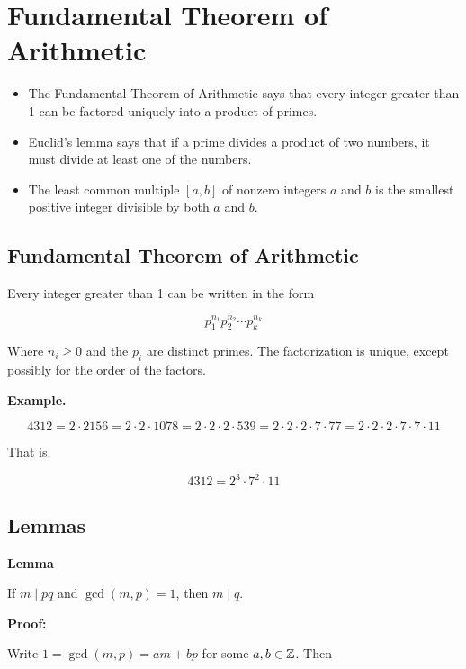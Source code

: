 \newpage
\section{Fundamental Theorem of Arithmetic}

\begin{itemize}

	\item The Fundamental Theorem of Arithmetic says that every integer greater than 1 can be factored 
		 uniquely into a product of primes.
	
	\item Euclid’s lemma says that if a prime divides a product of two numbers, it must divide at least 
		  one of the numbers.
	
	\item The least common multiple \([a, b]\) of nonzero integers \(a\) and \(b\) is the smallest positive 
	      integer divisible by both \(a\) and \(b\).

\end{itemize}

\subsection{Fundamental Theorem of Arithmetic}

Every integer greater than 1 can be written in the form

\[
	p_1^{n_1}p_2^{n_2} \cdots p_k^{n_k}
\]

Where \(n_i \geq 0\) and the \(p_i\) are distinct primes. The factorization is unique, except possibly for 
the order of the factors.

\textbf{Example.}

\[
	4312 = 2 \cdot 2156 = 2 \cdot 2 \cdot 1078 = 2 \cdot 2 \cdot 2 \cdot 539 = 2 \cdot 2 \cdot 2 \cdot 7 
	\cdot 77 = 2 \cdot 2 \cdot 2 \cdot 7 \cdot 7 \cdot 11
\]

That is,

\[
	4312 = 2^3 \cdot 7^2 \cdot 11
\]

\subsection{Lemmas}

\textbf{Lemma} 

If \(m \mid pq\) and \(\gcd(m, p) = 1\), then \(m \mid q\).

\textbf{Proof:} 

Write \(1 = \gcd(m, p) = am + bp\) for some \(a, b \in \mathbb{Z}\). Then

